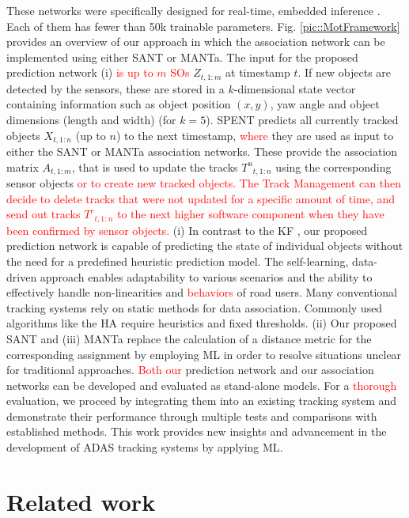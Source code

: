 \documentclass[letterpaper, 10 pt, journal, twoside]{IEEEtran}
\newcommand{\red}[1]{\textcolor{red}{#1}}
\begin{document}
These networks were specifically designed for real-time, embedded inference \red{{\cite{DL_TinyML.2019}}}. Each of them has fewer than 50k trainable parameters. Fig. {\ref{pic::MotFramework}} provides an overview of our approach in which the association network can be implemented using either \ac{SANT} or \ac{MANTa}.
The input for the proposed prediction network (i) \red{is up to $m$ \acp{SO}} $Z_{t,1:m}$ at timestamp $t$.
If new objects are detected by the sensors, these are stored in a $k$-dimensional state vector containing information such as object position $(x,y)$, yaw angle and object dimensions
(length and width) (for $k=5$).
\ac{SPENT} predicts all currently tracked objects $X_{t,1:n}$ (up to $n$) to the next timestamp, \red{where} they are used as input to either the SANT or MANTa association networks.
These provide the association matrix $A_{t,1:m}$, that is used to update the tracks ${T^u}_{t,1:n}$ using the corresponding sensor objects \red{or to create new tracked objects.}
\red{The Track Management can then decide to delete tracks that were not updated for a specific amount of time, and send out tracks ${T^c}_{t,1:n}$ to the next higher software component when they have been confirmed by sensor objects.}
(i) In contrast to the \ac{KF} {\cite{KF_BoundingBD.2023}}, our proposed prediction network is capable of predicting the state of individual objects without the need for a predefined heuristic prediction model. %
The self-learning, data-driven approach enables adaptability to various scenarios and the ability to effectively handle non-linearities and \red{behaviors} of road users.
Many conventional tracking systems rely on static methods for data association.
Commonly used algorithms like the \ac{HA} {\cite{DA_hungarian.1955}} require heuristics and fixed thresholds.
(ii) Our proposed \ac{SANT} and (iii) \ac{MANTa} replace the calculation of a distance metric for the corresponding assignment by employing \ac{ML} in order to resolve situations unclear for traditional approaches.
\red{Both our} prediction network and our association networks can be developed and evaluated as stand-alone models.
For a \red{thorough} evaluation, we proceed by integrating them into an existing tracking system and demonstrate their performance through multiple tests and comparisons with established methods.
This work provides new insights and advancement in the development of \ac{ADAS} tracking systems by applying \ac{ML}\@.

\section{Related work}
\end{document}
